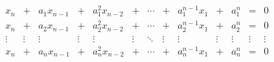 \documentclass[class=linear-algebra,crop=false]{standalone}
\begin{document}
\begin{exercise}
	\[
		\begin{array}{ccccccccccccc}
			x_{n}  & +      & a_{1}x_{n-1} & +      & a_{1}^{2}x_{n-2} & +      & \cdots & +      & a_{1}^{n-1}x_{1} & +      & a_{1}^{n} & =      & 0      \\
			x_{n}  & +      & a_{2}x_{n-1} & +      & a_{2}^{2}x_{n-2} & +      & \cdots & +      & a_{2}^{n-1}x_{1} & +      & a_{2}^{n} & =      & 0      \\
			\vdots & \vdots & \vdots       & \vdots & \vdots           & \vdots & \ddots & \vdots & \vdots           & \vdots & \vdots    & \vdots & \vdots \\
			x_{n}  & +      & a_{n}x_{n-1} & +      & a_{n}^{2}x_{n-2} & +      & \cdots & +      & a_{n}^{n-1}x_{1} & +      & a_{n}^{n} & =      & 0      \\
		\end{array}
	\]
\end{exercise}
\end{document}
